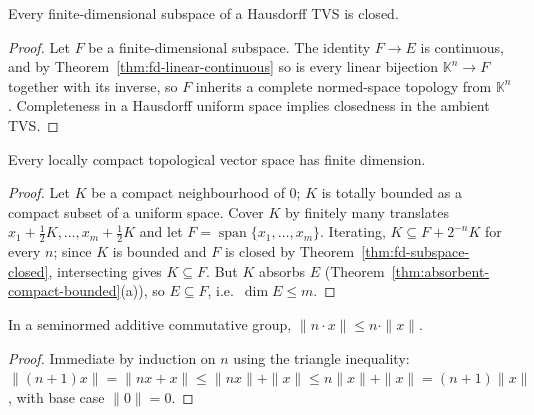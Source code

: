 \begin{theorem}
  \label{thm:fd-subspace-closed}
  \leanok
  Every finite-dimensional subspace of a Hausdorff TVS is closed.
\end{theorem}
\begin{proof}
  \leanok
  Let $F$ be a finite-dimensional subspace. The identity $F \to E$ is
  continuous, and by Theorem~\ref{thm:fd-linear-continuous} so is every
  linear bijection $\mathbb{K}^n \to F$ together with its inverse, so
  $F$ inherits a complete normed-space topology from $\mathbb{K}^n$.
  Completeness in a Hausdorff uniform space implies closedness in the
  ambient TVS.
\end{proof}

\begin{theorem}
  \label{thm:riesz-locallycompact}
  \leanok
  Every locally compact topological vector space has finite dimension.
\end{theorem}
\begin{proof}
  \leanok
  Let $K$ be a compact neighbourhood of $0$; $K$ is totally bounded as
  a compact subset of a uniform space. Cover $K$ by finitely many
  translates $x_1 + \tfrac{1}{2} K, \ldots, x_m + \tfrac{1}{2} K$ and
  let $F = \operatorname{span}\{x_1, \ldots, x_m\}$. Iterating, $K
  \subseteq F + 2^{-n} K$ for every $n$; since $K$ is bounded and $F$
  is closed by Theorem~\ref{thm:fd-subspace-closed}, intersecting gives
  $K \subseteq F$. But $K$ absorbs $E$
  (Theorem~\ref{thm:absorbent-compact-bounded}(a)), so $E \subseteq F$,
  i.e.\ $\dim E \le m$.
\end{proof}

\begin{theorem}
  \label{thm:nsmul-norm}
  \leanok
  In a seminormed additive commutative group,
  $\|n \cdot x\| \le n \cdot \|x\|$.
\end{theorem}
\begin{proof}
  \leanok
  Immediate by induction on $n$ using the triangle inequality:
  $\|(n+1) x\| = \|n x + x\| \le \|n x\| + \|x\| \le n\|x\| + \|x\| =
  (n+1)\|x\|$, with base case $\|0\| = 0$.
\end{proof}

